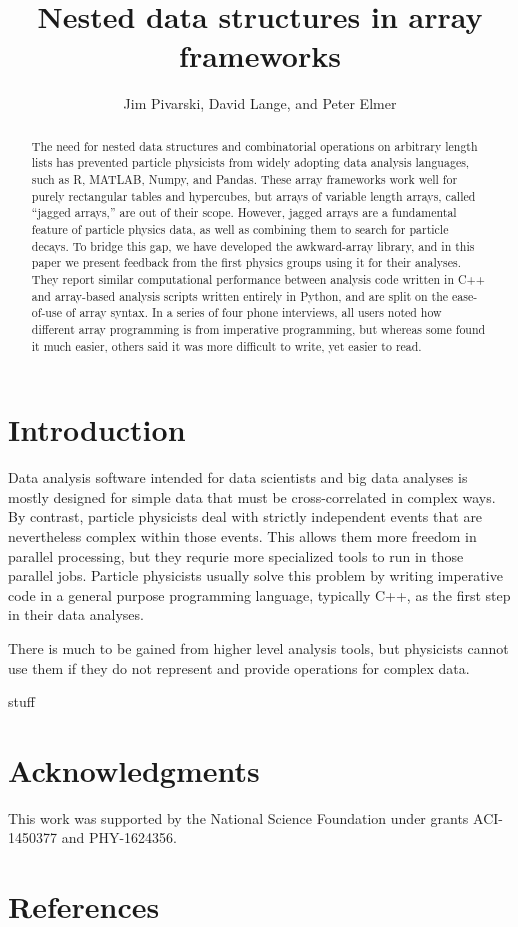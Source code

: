 \documentclass[a4paper]{jpconf}
\begin{document}
\title{Nested data structures in array frameworks}

\author{Jim Pivarski, David Lange, and Peter Elmer}

\address{Princeton University}


\begin{abstract}
The need for nested data structures and combinatorial operations on arbitrary length lists has prevented particle physicists from widely adopting data analysis languages, such as R, MATLAB, Numpy, and Pandas. These array frameworks work well for purely rectangular tables and hypercubes, but arrays of variable length arrays, called ``jagged arrays,'' are out of their scope. However, jagged arrays are a fundamental feature of particle physics data, as well as combining them to search for particle decays. To bridge this gap, we have developed the awkward-array library, and in this paper we present feedback from the first physics groups using it for their analyses. They report similar computational performance between analysis code written in C++ and array-based analysis scripts written entirely in Python, and are split on the ease-of-use of array syntax. In a series of four phone interviews, all users noted how different array programming is from imperative programming, but whereas some found it much easier, others said it was more difficult to write, yet easier to read.
\end{abstract}

\section{Introduction}

Data analysis software intended for data scientists and big data analyses is mostly designed for simple data that must be cross-correlated in complex ways. By contrast, particle physicists deal with strictly independent events that are nevertheless complex within those events. This allows them more freedom in parallel processing, but they requrie more specialized tools to run in those parallel jobs. Particle physicists usually solve this problem by writing imperative code in a general purpose programming language, typically C++, as the first step in their data analyses.

There is much to be gained from higher level analysis tools, but physicists cannot use them if they do not represent and provide operations for complex data.





stuff\cite{2019EPJWC}

\section{Acknowledgments}

This work was supported by the National Science Foundation under grants ACI-1450377 and PHY-1624356.

\section*{References}
{}

\end{document}
